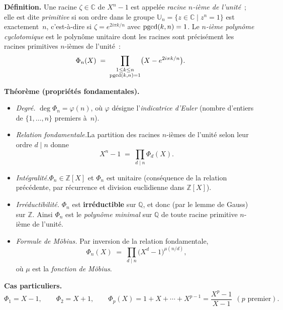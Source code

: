 

\providecommand{\Un}{\mathbb{U}}


\begin{tcolorbox}[thmbox]
  \textbf{Définition.}\enspace{}%
  Une racine $\zeta\in\mathbb{C}$ de $X^n-1$ est appelée \emph{racine
  $n$-ième de l'unité}~; elle est dite \emph{primitive} si son ordre dans le
  groupe $\Un_n=\{z\in\mathbb{C}\mid z^n=1\}$ est exactement~$n$, c'est-à-dire
  si $\zeta=e^{2i\pi k/n}$ avec $\operatorname{pgcd}(k,n)=1$. Le \emph{$n$-ième polynôme
  cyclotomique} est le polynôme unitaire dont les racines sont précisément les
  racines primitives $n$-ièmes de l'unité~:
  \[
    \Phi_n(X) \;=\; \prod_{\substack{1\leq k\leq n\\ \operatorname{pgcd}(k,n)=1}}
      \bigl(X-e^{2i\pi k/n}\bigr).
  \]

  \medskip
  \textbf{Théorème (propriétés fondamentales).}
  \begin{itemize}
    \item \textit{Degré.}\enspace{}
      $\deg\Phi_n=\varphi(n)$, où $\varphi$ désigne l'\emph{indicatrice
      d'Euler} (nombre d'entiers de $\{1,\ldots,n\}$ premiers à~$n$).
    \item \textit{Relation fondamentale.}\enspace La partition des racines
      $n$-ièmes de l'unité selon leur ordre $d\mid n$ donne
      \[
        X^n-1 \;=\; \prod_{d\mid n}\Phi_d(X).
      \]
    \item \textit{Intégralité.}\enspace $\Phi_n\in\mathbb{Z}[X]$ et $\Phi_n$
      est unitaire (conséquence de la relation précédente, par récurrence et
      division euclidienne dans $\mathbb{Z}[X]$).
    \item \textit{Irréductibilité.}\enspace
      $\Phi_n$ est \textbf{irréductible} sur $\mathbb{Q}$, et donc (par le
      lemme de Gauss) sur $\mathbb{Z}$. Ainsi $\Phi_n$ est le \emph{polynôme
      minimal} sur $\mathbb{Q}$ de toute racine primitive $n$-ième de l'unité.
    \item \textit{Formule de Möbius.}\enspace{}
      Par inversion de la relation fondamentale,
      \[
        \Phi_n(X) \;=\; \prod_{d\mid n}\bigl(X^d-1\bigr)^{\mu(n/d)},
      \]
      où $\mu$ est la \emph{fonction de Möbius}.
  \end{itemize}

  \medskip
  \textbf{Cas particuliers.}
  \[
    \Phi_1=X-1,\qquad \Phi_2=X+1,\qquad
    \Phi_p(X)=1+X+\cdots+X^{p-1}=\frac{X^p-1}{X-1}\ \ (p\text{ premier}).
  \]
\end{tcolorbox}

